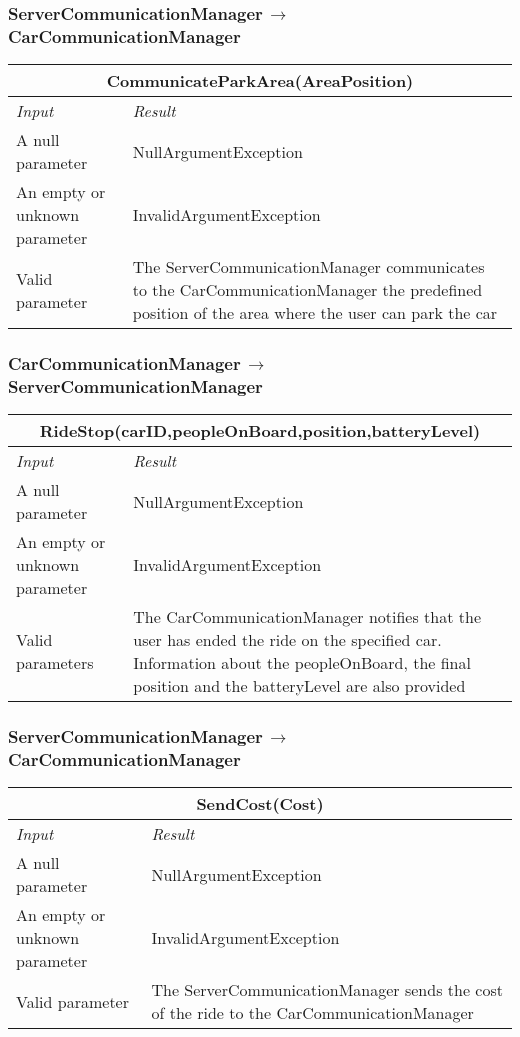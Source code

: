 \documentclass[11pt,a4paper]{report}
\begin{document}
\subsubsection{ServerCommunicationManager$\,\to\,$CarCommunicationManager}
\begin{tabularx}{\textwidth}{|X|X|}
	\hline
	\multicolumn{2}{|c|}{\textbf{CommunicateParkArea(AreaPosition)}}\\
	\hline
	\textit{Input} & \textit{Result}\\
	\hline
	A null parameter & NullArgumentException\\
	\hline
	An empty or unknown parameter & InvalidArgumentException\\
	\hline
	Valid parameter & The ServerCommunicationManager communicates to the CarCommunicationManager the predefined position of the area where the user can park the car\\
	\hline
\end{tabularx}
\subsubsection{CarCommunicationManager$\,\to\,$ServerCommunicationManager}
\begin{tabularx}{\textwidth}{|X|X|}
	\hline
	\multicolumn{2}{|c|}{\textbf{RideStop(carID,peopleOnBoard,position,batteryLevel)}}\\
	\hline
	\textit{Input} & \textit{Result}\\
	\hline
	A null parameter & NullArgumentException\\
	\hline
	An empty or unknown parameter & InvalidArgumentException\\
	\hline
	Valid parameters & The CarCommunicationManager notifies that the user has ended the ride on the specified car. Information about the peopleOnBoard, the final position and the batteryLevel are also provided\\
	\hline
\end{tabularx}
\subsubsection{ServerCommunicationManager$\,\to\,$CarCommunicationManager}
\begin{tabularx}{\textwidth}{|X|X|}
	\hline
	\multicolumn{2}{|c|}{\textbf{SendCost(Cost)}}\\
	\hline
	\textit{Input} & \textit{Result}\\
	\hline
	A null parameter & NullArgumentException\\
	\hline
	An empty or unknown parameter & InvalidArgumentException\\
	\hline
	Valid parameter & The ServerCommunicationManager sends the cost of the ride to the CarCommunicationManager\\
	\hline
\end{tabularx}
\end{document}
